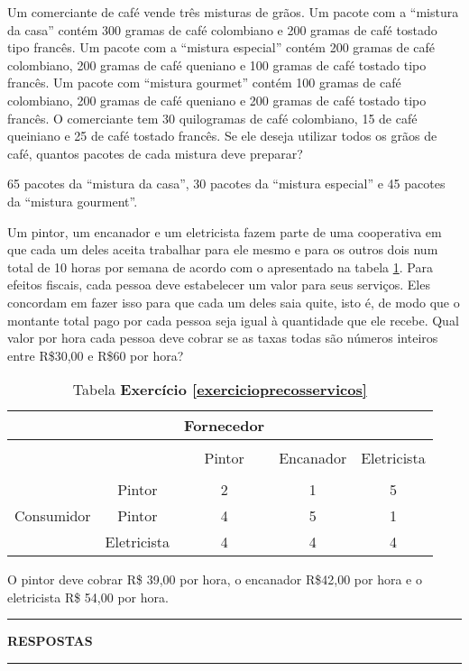 \documentclass[12pt]{exam}
\begin{document}
\begin{exercicio}
  Um comerciante de café vende três misturas de grãos. Um pacote com a ``mistura da casa'' contém 300 gramas de café colombiano e 200 gramas de café tostado tipo francês. Um pacote com a ``mistura especial'' contém 200 gramas de café colombiano, 200 gramas de café queniano e 100 gramas de café tostado tipo francês. Um pacote com ``mistura gourmet'' contém 100 gramas de café colombiano, 200 gramas de café queniano e 200 gramas de café tostado tipo francês. O comerciante tem 30 quilogramas de café colombiano, 15 de café queiniano e 25 de café tostado francês. Se ele deseja utilizar todos os grãos de café, quantos pacotes de cada mistura deve preparar?
  \begin{solucao}
    65 pacotes da ``mistura da casa'', 30 pacotes da ``mistura especial'' e 45 pacotes da ``mistura gourment''.
  \end{solucao}
\end{exercicio}

\begin{exercicio}\label{exercicioprecosservicos}
  Um pintor, um encanador e um eletricista fazem parte de uma cooperativa em que cada um deles aceita trabalhar para ele mesmo e para os outros dois num total de 10 horas por semana de acordo com o apresentado na tabela \ref{tabelavalores}. Para efeitos fiscais, cada pessoa deve estabelecer um valor para seus serviços. Eles concordam em fazer isso para que cada um deles saia quite, isto é, de modo que o montante total pago por cada pessoa seja igual à quantidade que ele recebe. Qual valor por hora cada pessoa deve cobrar se as taxas todas são números inteiros entre R\$30,00 e R\$60 por hora?
  \begin{table}[!h]
    \begin{center}
      \begin{tabular}{lcccc}
        & & Fornecedor\\
        \hline\\
        & & Pintor & Encanador & Eletricista\\
        \hline\\
        & Pintor & 2 & 1 & 5\\
        Consumidor & Pintor & 4 & 5 & 1\\
        & Eletricista & 4 & 4 & 4\\
        \hline
      \end{tabular}
      \caption{Tabela \textbf{Exercício \ref{exercicioprecosservicos}}}
      \label{tabelavalores}
    \end{center}
  \end{table}
  \begin{solucao}
    O pintor deve cobrar R\$ 39,00 por hora, o encanador R\$42,00 por hora e o eletricista R\$ 54,00 por hora.
  \end{solucao}
\end{exercicio}

\newpage
{}
\hrule
\begin{center}
{\large\bf RESPOSTAS}
\end{center}
\hrule

\end{document}
